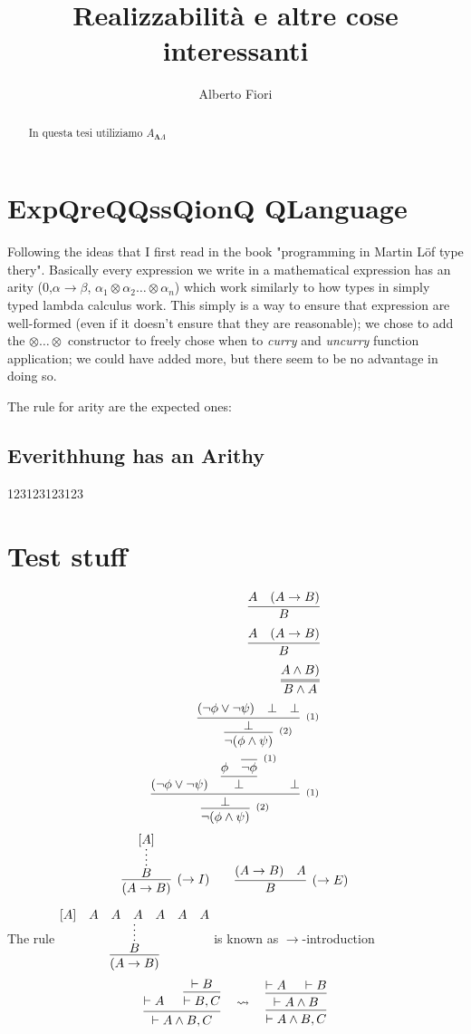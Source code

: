 \documentclass[12pt,a5paper,draft,oneside]{report}
\author{Alberto Fiori}
\title{Realizzabilità e altre cose interessanti}
\begin{document}
\begin{abstract}
In questa tesi utiliziamo $A_{\bm{\Lambda}\Lambda}$
\end{abstract}

\chapter{ExpQreQQssQionQ QLanguage}
	Following the ideas that I first read in the book "programming in Martin Löf type thery". Basically every expression we write in a mathematical expression has an arity (0,$\alpha\rightarrow\beta$, $\alpha_1\otimes\alpha_2\ldots\otimes\alpha_n$) which work similarly to how types in simply typed lambda calculus work. 
	This simply is a way to ensure that expression are well-formed (even if it doesn't ensure that they are reasonable); we chose to add the $\otimes\ldots\otimes$ constructor to freely chose when to \emph{curry} and \emph{uncurry} function application; we could have added more, but there seem to be no advantage in doing so.
	
	The rule for arity are the expected ones:
	
	
	\section{Everithhung has an Arithy} 
		123123123123

\chapter{Test stuff}
	\begin{eqnarray}
		\infer{B}{A & (A \rightarrow B)}	\\
		\infer{B}{A & (A \rightarrow B)}	\\
		\infer={B \land A}{A \land B)}		\\
		\infer[^{(2)}]
     {\neg(\phi \land \psi)}
     {\infer[^{(1)}]
        {\bot}
        {(\neg\phi \lor \neg\psi) & \bot & \bot}
     }
     \\
     \infer[^{(2)}]
     {\neg(\phi \land \psi)}
     {\infer[^{(1)}]
        {\bot}
        {(\neg\phi \lor \neg\psi) & 
        \infer
            {\bot}
            {\phi & 
            \infer[^{(1)}]
            {\neg\phi}{}
            } 
        & \bot}
     }\\     
	\end{eqnarray}
$$
\infer[(\to I)]
     {(A \to B)}
     {
     \infer*{B}{[A]}
     }
\qquad
\infer[(\to E)]
     {B}
     {(A \to B) & A}
$$



The rule 
$\vcenter
{
\infer
    {(A \to B)}
    {
    \infer*{B}{[A] & A & A & A & A & A & A}
    }
}$
is known as $\to$-introduction
\newpage
\[
\begin{prooftree}
\Hypo{ \vdash A }
\Hypo{ \vdash B } \Infer1{ \vdash B, C }
\Infer2{ \vdash A\wedge B, C }
\end{prooftree}
%
\quad \rightsquigarrow \quad
\begin{prooftree}
\Hypo{ \vdash A } \Hypo{ \vdash B }
\Infer2{ \vdash A\wedge B }
\Infer1{ \vdash A\wedge B, C }
\end{prooftree}
\]
\end{document}
